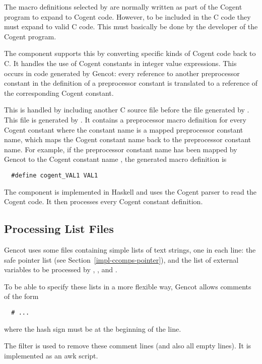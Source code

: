 The macro definitions selected by  are normally written as part of the Cogent program to expand 
to Cogent code. However, to be included in the C code they must expand to valid C code. This must basically be done
by the developer of the Cogent program. 

The  component supports this by converting specific kinds of Cogent code back to C. It handles 
the use of Cogent constants in integer value expressions. This occurs in code generated by Gencot: every reference 
to another preprocessor constant in the definition of a preprocessor constant is translated to a reference of the 
corresponding Cogent constant.

This is handled by including another C source file before the file generated by . This
file is generated by . It contains a preprocessor macro definition for every Cogent constant
where the constant name is a mapped preprocessor constant name, which maps the Cogent constant name back to 
the preprocessor constant name. For example, if the preprocessor constant name  has been mapped by
Gencot to the Cogent constant name , the generated macro definition is
\begin{verbatim}
  #define cogent_VAL1 VAL1
\end{verbatim}

The component  is implemented in Haskell and uses the Cogent parser to read the Cogent code.
It then processes every Cogent constant definition.

\subsection{Processing List Files}
\label{impl-ocomps-prclist}

Gencot uses some files containing simple lists of text strings, one in each line: the safe pointer list (see 
Section~\ref{impl-ccomps-pointer}), and the list of external variables to be processed by , 
, and .

To be able to specify these lists in a more flexible way, Gencot allows comments of the form
\begin{verbatim}
  # ...
\end{verbatim}
where the hash sign must be at the beginning of the line.

The filter  is used to remove these comment lines (and also all empty lines). It is implemented
as an awk script.

